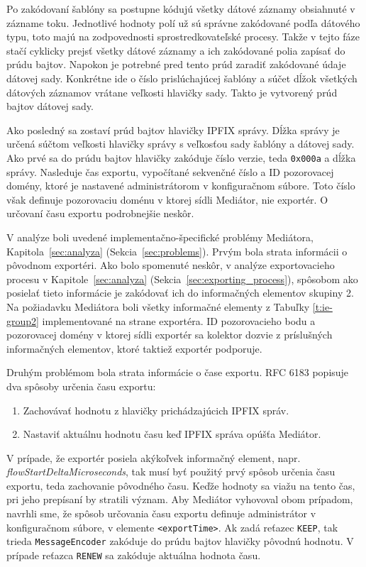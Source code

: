 Po zakódovaní šablóny sa postupne kódujú všetky dátové záznamy obsiahnuté v zázname toku. Jednotlivé 
hodnoty polí už sú správne zakódované podľa dátového typu, toto majú na zodpovednosti sprostredkovateľské
procesy. Takže v tejto fáze stačí cyklicky prejsť všetky dátové záznamy a ich zakódované polia zapísať 
do prúdu bajtov. Napokon je potrebné pred tento prúd zaradiť zakódované údaje dátovej sady. Konkrétne
ide o číslo prislúchajúcej šablóny a súčet dĺžok všetkých dátových záznamov vrátane veľkosti hlavičky sady.
Takto je vytvorený prúd bajtov dátovej sady.

Ako posledný sa zostaví prúd bajtov hlavičky IPFIX správy. Dĺžka správy je určená súčtom veľkosti hlavičky
správy s veľkosťou sady šablóny a dátovej sady. Ako prvé sa do prúdu bajtov hlavičky zakóduje číslo 
verzie, teda \verb|0x000a| a dĺžka správy. Nasleduje čas exportu, vypočítané sekvenčné číslo a ID 
pozorovacej domény, ktoré je nastavené administrátorom v konfiguračnom súbore. Toto číslo však definuje
pozorovaciu doménu v ktorej sídli Mediátor, nie exportér. O určovaní času exportu podrobnejšie neskôr.

V analýze boli uvedené implementačno-špecifické problémy Mediátora, Kapitola~\ref{sec:analyza} 
(Sekcia~\ref{sec:problems}). Prvým bola strata informácii o pôvodnom exportéri. Ako bolo spomenuté neskôr, 
v analýze exportovacieho procesu v Kapitole~\ref{sec:analyza} (Sekcia~\ref{sec:exporting_process}),
spôsobom ako posielať tieto informácie je zakódovať ich do informačných elementov skupiny 2. Na požiadavku
Mediátora boli všetky informačné elementy z Tabuľky \ref{t:ie-group2} implementované na strane exportéra.
ID pozorovacieho bodu a pozorovacej domény v ktorej sídli exportér sa kolektor dozvie z príslušných 
informačných elementov, ktoré taktiež exportér podporuje. 

Druhým problémom bola strata informácie o čase exportu. RFC 6183 \citep{rfc6183} popisuje dva spôsoby 
určenia času exportu:
\begin{enumerate}
 \item Zachovávať hodnotu z hlavičky prichádzajúcich IPFIX správ.
 \item Nastaviť aktuálnu hodnotu času keď IPFIX správa opúšťa Mediátor.
\end{enumerate}
V prípade, že exportér posiela akýkoľvek  informačný element, napr. \emph{flowStartDeltaMicroseconds},
tak musí byť použitý prvý spôsob určenia času exportu, teda zachovanie pôvodného času. Keďže 
 hodnoty sa viažu na tento čas, pri jeho prepísaní by stratili význam. Aby Mediátor 
vyhovoval obom prípadom, navrhli sme, že spôsob určovania času exportu definuje administrátor v 
konfiguračnom súbore, v elemente \verb|<exportTime>|. 
Ak zadá reťazec \verb|KEEP|, tak trieda \verb|MessageEncoder| zakóduje do prúdu bajtov hlavičky pôvodnú
hodnotu. V prípade reťazca \verb|RENEW| sa zakóduje aktuálna hodnota času.

